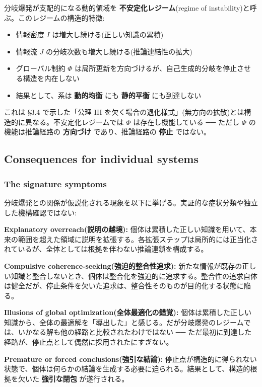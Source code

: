 分岐爆発が支配的になる動的領域を \textbf{不安定化レジーム}(regime of instability)と呼ぶ。このレジームの構造的特徴:

\begin{itemize}
\item 情報密度 $I$ は増大し続ける(正しい知識の累積)
\item 情報流 $J$ の分岐次数も増大し続ける(推論連結性の拡大)
\item グローバル制約 $\Phi$ は局所更新を方向づけるが、自己生成的分岐を停止させる構造を内在しない
\item 結果として、系は \textbf{動的均衡} にも \textbf{静的平衡} にも到達しない
\end{itemize}

これは \S{}3.4 で示した「公理 III を欠く場合の退化様式」(無方向の拡散)とは構造的に異なる。不安定化レジームでは $\Phi$ は存在し機能している ── ただし $\Phi$ の機能は推論経路の \textbf{方向づけ} であり、推論経路の \textbf{停止} ではない。

\subsection{Consequences for individual systems}


\subsubsection{The signature symptoms}


分岐爆発との関係が仮説化される現象を以下に挙げる。実証的な症状分類や独立した機構確認ではない:

\textbf{Explanatory overreach(説明の越境):}
個体は累積した正しい知識を用いて、本来の範囲を超えた領域に説明を拡張する。各拡張ステップは局所的には正当化されているが、全体としては根拠を伴わない推論連鎖を構成する。

\textbf{Compulsive coherence-seeking(強迫的整合性追求):}
新たな情報が既存の正しい知識と整合しないとき、個体は整合化を強迫的に追求する。整合性の追求自体は健全だが、停止条件を欠いた追求は、整合性そのものが目的化する状態に陥る。

\textbf{Illusions of global optimization(全体最適化の錯覚):}
個体は累積した正しい知識から、全体の最適解を「導出した」と感じる。だが分岐爆発のレジームでは、いかなる解も他の経路と比較されたわけではない ── ただ最初に到達した経路が、停止点として偶然に採用されたにすぎない。

\textbf{Premature or forced conclusions(強引な結論):}
停止点が構造的に得られない状態で、個体は何らかの結論を生成する必要に迫られる。結果として、構造的根拠を欠いた \textbf{強引な閉包} が遂行される。

